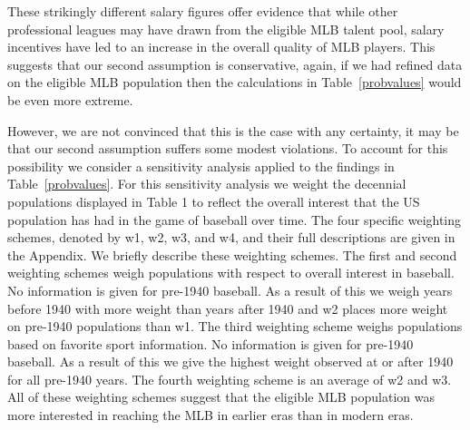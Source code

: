 \documentclass[11pt]{article}\usepackage[]{graphicx}\usepackage[]{color}
\begin{document}
These strikingly different salary figures offer evidence that while other 
professional leagues may have drawn from the eligible MLB talent pool, 
salary incentives have led to an increase in the overall quality of MLB 
players.  This suggests that our second assumption is conservative, 
again, if we had refined data on the eligible MLB population then the 
calculations in Table~\ref{probvalues} would be even more extreme.  











However, we are not convinced that this is the case with any certainty, 
it may be that our second assumption suffers some modest violations.  
To account for this possibility we consider a sensitivity 
analysis applied to the findings in Table~\ref{probvalues}.  For this 
sensitivity analysis we weight the decennial populations displayed in Table 1 
to reflect the overall interest that the US population has had in the game of 
baseball over time.  The four specific weighting schemes, denoted by w1, w2, 
w3, and w4, and their full descriptions are given in the Appendix.  We briefly 
describe these weighting schemes.  The first and second weighting schemes 
weigh populations with respect to overall interest in baseball.  
No information is given for pre-1940 baseball.  As a result of this 
we weigh years before 1940 with more weight than years after 1940 
and w2 places more weight on pre-1940 populations than w1.  
The third weighting scheme weighs populations based on favorite sport 
information.  No information is given for pre-1940 baseball.  As a result of 
this we give the highest weight observed at or after 1940 for all 
pre-1940 years.  The fourth weighting scheme is an average of w2 and w3.  
All of these weighting schemes suggest that the eligible MLB population was 
more interested in reaching the MLB in earlier eras than in modern eras.  
\end{document}

